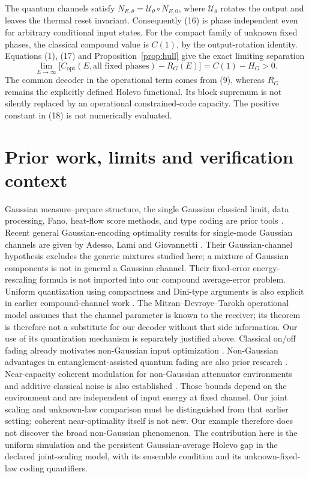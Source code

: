 \documentclass[11pt]{article}
\newcommand{\capq}{C_{\mathrm{opt}}}
\begin{document}
The quantum channels satisfy
\(N_{E,\theta}=\mathcal U_\theta\circ N_{E,0}\), where
\(\mathcal U_\theta\) rotates the output and leaves the thermal reset
invariant. Consequently (16) is phase independent even for arbitrary
conditional input states. For the compact family of unknown fixed
phases, the classical compound value is \(C(1)\), by the output-rotation
identity. Equations (1), (17) and Proposition~\ref{prop:hull} give
the exact limiting separation
\[
 \lim_{E\to\infty}
 \bigl[\capq(E,\text{all fixed phases})-R_G(E)\bigr]
       =C(1)-H_G>0.                                      \tag{18}
\]
The common decoder in the operational term comes from (9), whereas
\(R_G\) remains the explicitly defined Holevo functional. Its block
supremum is not silently replaced by an operational constrained-code
capacity. The positive constant in (18) is not numerically evaluated.

\section{Prior work, limits and verification context}

Gaussian measure--prepare structure, the single Gaussian classical
limit, data processing, Fano, heat-flow score methods, and type coding
are prior tools \cite{holevoEB,holevoReview,types,compound}.
Recent general Gaussian-encoding optimality results for single-mode
Gaussian channels are given by Adesso, Lami and Giovannetti
\cite{adesso2026}. Their Gaussian-channel hypothesis excludes the
generic mixtures studied here; a mixture of Gaussian components is not
in general a Gaussian channel. Their fixed-error energy-rescaling
formula is not imported into our compound average-error problem.
Uniform quantization using compactness and Dini-type arguments is also
explicit in earlier compound-channel work \cite{mitran,schaefer}.
The Mitran--Devroye--Tarokh operational model assumes that the channel
parameter is known to the receiver; its theorem is therefore not a
substitute for our decoder without that side information.
Our use of its quantization mechanism is separately justified above.
Classical on/off fading already motivates non-Gaussian input
optimization \cite{tu}. Non-Gaussian advantages in entanglement-assisted
quantum fading are also prior research \cite{catalano}.
Near-capacity coherent modulation for non-Gaussian attenuator environments
and additive classical noise is also established \cite{huber}.
Those bounds depend on the environment and are independent of input
energy at fixed channel. Our joint scaling and unknown-law comparison
must be distinguished from that earlier setting; coherent near-optimality
itself is not new. Our example therefore does not discover the broad
non-Gaussian phenomenon.
The contribution here is the uniform simulation and the persistent
Gaussian-average Holevo gap in the declared joint-scaling model, with
its ensemble condition and its unknown-fixed-law coding quantifiers.
\end{document}
